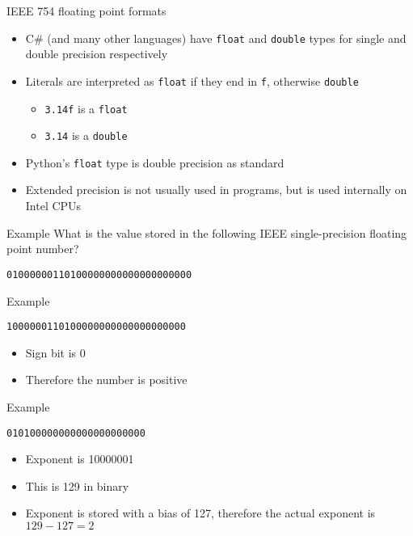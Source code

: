 \begin{frame}[fragile]{IEEE 754 floating point formats}
	\begin{itemize}
		\pause\item C\# (and many other languages) have \lstinline{float} and \lstinline{double} types
			for single and double precision respectively
		\pause\item Literals are interpreted as \lstinline{float} if they end in \lstinline{f}, otherwise \lstinline{double}
			\begin{itemize}
				\pause\item \lstinline{3.14f} is a \lstinline{float}
				\pause\item \lstinline{3.14} is a \lstinline{double}
			\end{itemize}
		\pause\item Python's \lstinline{float} type is double precision as standard
		\pause\item Extended precision is not usually used in programs, but is used internally on Intel CPUs
	\end{itemize}
\end{frame}

\begin{frame}{Example}
	\pause
	What is the value stored in the following IEEE single-precision floating point number?
	\begin{center}
		\texttt{01000000110100000000000000000000}
	\end{center}
\end{frame}

\begin{frame}{Example}
	\pause
	\begin{center}
		\texttt{1000000110100000000000000000000}
	\end{center}
	\begin{itemize}
		\pause\item Sign bit is 0
		\pause\item Therefore the number is positive
	\end{itemize}
\end{frame}

\begin{frame}{Example}
	\pause
	\begin{center}
		\texttt{010100000000000000000000}
	\end{center}
	\begin{itemize}
		\pause\item Exponent is 10000001
		\pause\item This is 129 in binary
		\pause\item Exponent is stored with a bias of 127, therefore the actual exponent is
			$129 - 127 = 2$
	\end{itemize}
\end{frame}

